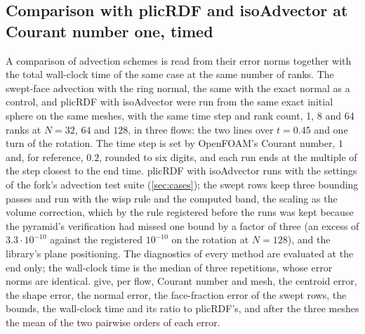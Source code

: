 \documentclass[preprint,12pt]{elsarticle}
\begin{document}
\subsection{Comparison with plicRDF and isoAdvector at Courant number one, timed}
\label{sec:cmp}

A comparison of advection schemes is read from their error norms together with the total wall-clock time of the same case at the same number of ranks. The swept-face advection with the ring normal, the same with the exact normal as a control, and plicRDF with isoAdvector were run from the same exact initial sphere on the same meshes, with the same time step and rank count, 1, 8 and 64 ranks at $N = 32$, $64$ and $128$, in three flows: the two lines over $t = 0.45$ and one turn of the rotation. The time step is set by OpenFOAM's Courant number, $1$ and, for reference, $0.2$, rounded to six digits, and each run ends at the multiple of the step closest to the end time. plicRDF with isoAdvector runs with the settings of the fork's advection test suite (\cref{sec:cases}); the swept rows keep three bounding passes and run with the wisp rule and the computed band, the scaling as the volume correction, which by the rule registered before the runs was kept because the pyramid's verification had missed one bound by a factor of three (an excess of $3.3\cdot10^{-10}$ against the registered $10^{-10}$ on the rotation at $N = 128$), and the library's plane positioning. The diagnostics of every method are evaluated at the end only; the wall-clock time is the median of three repetitions, whose error norms are identical.  give, per flow, Courant number and mesh, the centroid error, the shape error, the normal error, the face-fraction error of the swept rows, the bounds, the wall-clock time and its ratio to plicRDF's, and after the three meshes the mean of the two pairwise orders of each error.
\end{document}
